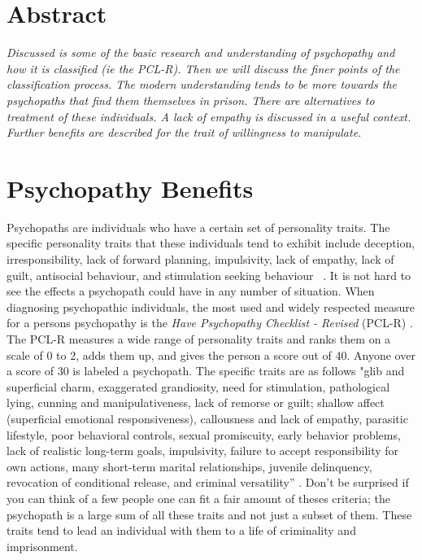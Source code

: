 \documentclass[12pt,jou]{apa}
\begin{document}


\pagestyle{fancy}
\fancyhf{}
\fancyhead[R]{\thepage}
\section{Abstract}
\textit{
Discussed is some of the basic research and understanding of
psychopathy and how it is classified (ie the PCL-R). Then we will discuss the
finer points of the classification process. The modern understanding tends to be
more towards the psychopaths that find them themselves in prison. There are
alternatives to treatment of these individuals. A lack of empathy is discussed
in a useful context. Further benefits are described for the trait of willingness
to manipulate. 
}
\section{Psychopathy Benefits} 
Psychopaths are individuals who have a certain set of personality traits.
 The specific personality traits that these individuals tend
to exhibit include deception, irresponsibility, lack of forward planning,
impulsivity, lack of empathy, lack of guilt, antisocial behaviour, and
stimulation seeking behaviour ~\cite{brazil}. It is not hard to see the effects
a psychopath could have in any number of situation. When diagnosing
psychopathic individuals, the most used and widely respected measure for a
persons psychopathy is the \textit{Have Psychopathy Checklist - Revised
}(PCL-R) \cite{nickerson2014}. The PCL-R measures a wide range of personality
traits and ranks them on a scale of 0 to 2, adds them up, and gives the person
a score out of 40. Anyone over a score of 30 is labeled a psychopath. The
specific traits are as follows "glib and superficial charm, exaggerated
grandiosity, need for stimulation, pathological lying, cunning and
manipulativeness, lack of remorse or guilt; shallow affect (superficial
emotional responsiveness), callousness and lack of empathy, parasitic
lifestyle, poor behavioral controls, sexual promiscuity, early behavior
problems, lack of realistic long-term goals, impulsivity, failure to accept
responsibility for own actions, many short-term marital relationships, juvenile
delinquency, revocation of conditional release, and criminal versatility”
\cite{hareharpur1991}. Don't be surprised if you can think of a few people one
can fit a fair amount of theses criteria; the psychopath is a large sum of all
these traits and not just a subset of them. These traits tend to lead an
individual with them to a life of criminality and imprisonment. 
\end{document}
